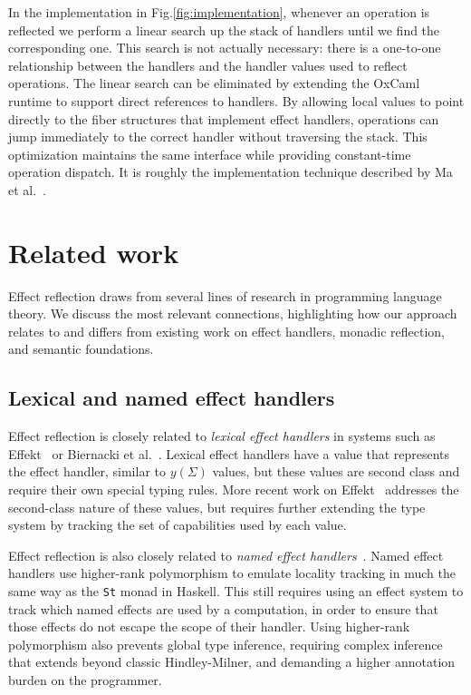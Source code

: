 \documentclass[acmsmall, screen, review, anonymous]{acmart}
\theoremstyle{definition}
\newcommand{\yoneda}[1]{y(#1)}
\begin{document}
In the implementation in Fig.\ref{fig:implementation}, whenever an
operation is reflected we perform a linear search up the stack of
handlers until we find the corresponding one. This search is not
actually necessary: there is a one-to-one relationship between the
handlers and the handler values used to reflect operations. The linear
search can be eliminated by extending the OxCaml runtime to support
direct references to handlers. By allowing local values to point
directly to the fiber structures that implement effect handlers,
operations can jump immediately to the correct handler without
traversing the stack. This optimization maintains the same interface
while providing constant-time operation dispatch. It is roughly the
implementation technique described by Ma et al.~\cite{ma2024lexical}.

\section{Related work}
\label{sec:related-work}

Effect reflection draws from several lines of research in programming
language theory. We discuss the most relevant connections, highlighting
how our approach relates to and differs from existing work on effect
handlers, monadic reflection, and semantic foundations.

\subsection{Lexical and named effect handlers}

Effect reflection is closely related to \emph{lexical effect handlers}
in systems such as Effekt~\cite{brachthauser2020effects} or Biernacki et
al.~\cite{biernacki2019binders}. Lexical effect handlers have a value
that represents the effect handler, similar to $\yoneda{\Sigma}$ values,
but these values are second class and require their own special typing
rules. More recent work on Effekt~\cite{brachthauser2022effects}
addresses the second-class nature of these values, but requires further
extending the type system by tracking the set of capabilities used by
each value.

Effect reflection is also closely related to \emph{named effect
  handlers}~\cite{xie2022first}. Named effect handlers use higher-rank
polymorphism to emulate locality tracking in much the same way as the
\lstinline[style=haskell]{St} monad in Haskell. This still requires
using an effect system to track which named effects are used by a
computation, in order to ensure that those effects do not escape the
scope of their handler. Using higher-rank polymorphism also prevents
global type inference, requiring complex inference that extends beyond
classic Hindley-Milner, and demanding a higher annotation burden on the
programmer.
\end{document}
